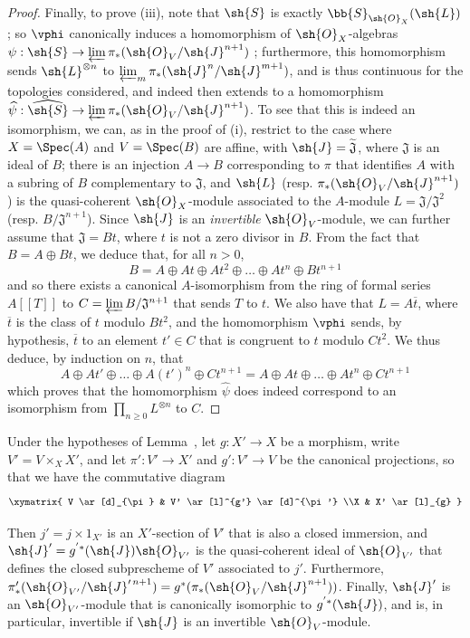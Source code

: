 \begin{proof}
Finally, to prove (iii), note that $\sh{S}$ is exactly $\bb{S}_{\sh{O}_X}(\sh{L})$;
so $\vphi$ canonically induces a homomorphism of $\sh{O}_X$-algebras $\psi:\sh{S}\to\varprojlim\pi_*(\sh{O}_V/\sh{J}^{n+1})$ ;
  furthermore, this homomorphism sends $\sh{L}^{\otimes n}$ to $\varprojlim_m\pi_*(\sh{J}^n/\sh{J}^{m+1})$, and is thus continuous for the topologies considered, and indeed then extends to a homomorphism $\widehat{\psi}:\widehat{\sh{S}}\to\varprojlim\pi_*(\sh{O}_V/\sh{J}^{n+1})$.
To see that this is indeed an isomorphism, we can, as in the proof of (i), restrict to the case where $X=\Spec(A)$ and $V=\Spec(B)$ are affine, with $\sh{J}=\widetilde{\mathfrak{J}}$, where $\mathfrak{J}$ is an ideal of $B$;
  there is an injection $A\to B$ corresponding to $\pi$ that identifies $A$ with a subring of $B$ complementary to $\mathfrak{J}$, and $\sh{L}$ (resp. $\pi_*(\sh{O}_V/\sh{J}^{n+1})$) is the quasi-coherent $\sh{O}_X$-module associated to the $A$-module $L=\mathfrak{J}/\mathfrak{J}^2$ (resp. $B/\mathfrak{J}^{n+1}$).
Since $\sh{J}$ is an \emph{invertible} $\sh{O}_V$-module, we can further assume that $\mathfrak{J}=Bt$, where $t$ is not a zero divisor in $B$.
From the fact that $B=A\oplus Bt$, we deduce that, for all $n>0$,
\[
  B = A \oplus At \oplus At^2 \oplus \ldots \oplus At^n \oplus Bt^{n+1}
\]
and so there exists a canonical $A$-isomorphism from the ring of formal series $A[[T]]$ to $C=\varprojlim B/\mathfrak{J}^{n+1}$ that sends $T$ to $t$.
We also have that $L=A\overline{t}$, where $\overline{t}$ is the class of $t$ modulo $Bt^2$, and the homomorphism $\vphi$ sends, by hypothesis, $\overline{t}$ to an element $t'\in C$ that is congruent to $t$ modulo $Ct^2$.
We thus deduce, by induction on $n$, that
\[
  A \oplus At' \oplus \ldots \oplus A(t')^n \oplus Ct^{n+1}
  =
  A \oplus At \oplus \ldots \oplus At^n \oplus Ct^{n+1}
\]
which proves that the homomorphism $\widehat{\psi}$ does indeed correspond to an isomorphism from $\prod_{n\geq0}L^{\otimes n}$ to $C$.
\end{proof}

\begin{lemma}[8.10.2]
\label{II.8.10.2}
Under the hypotheses of Lemma~, let $g:X'\to X$ be a morphism,
write $V'=V\times_X X'$, and let $\pi':V'\to X'$ and $g':V'\to V$ be the canonical projections, so that we have the commutative diagram
\[
  \xymatrix{
    V
      \ar[d]_{\pi}
  & V'
      \ar[l]^{g'}
      \ar[d]^{\pi'}
  \\X
  & X'
      \ar[l]_{g}
  }
\]

Then $j'=j\times1_{X'}$ is an $X'$-section of $V'$ that is also a closed immersion, and $\sh{J}'=g^{'*}(\sh{J})\sh{O}_{V'}$ is the quasi-coherent ideal of $\sh{O}_{V'}$ that defines the closed subprescheme of $V'$ associated to $j'$.
Furthermore, $\pi'_*(\sh{O}_{V'}/\sh{J}'^{\,n+1}) = g^*(\pi_*(\sh{O}_V/\sh{J}^{n+1}))$.
Finally, $\sh{J}'$ is an $\sh{O}_{V'}$-module that is canonically isomorphic to $g^{'*}(\sh{J})$, and is, in particular, invertible if $\sh{J}$ is an invertible $\sh{O}_V$-module.
\end{lemma}

